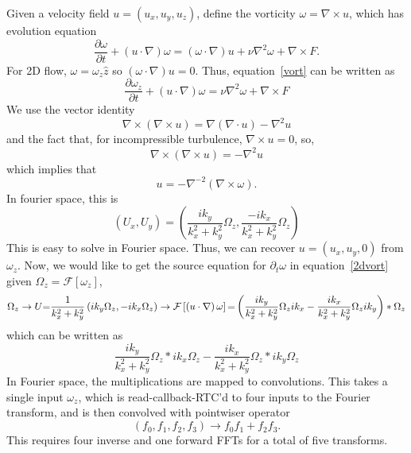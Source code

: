 \documentclass[12pt]{article}
\renewcommand{\(}{\left(}
\renewcommand{\)}{\right)}
\begin{document}
Given a velocity field $u=\(u_x,u_y,u_z\)$, define the vorticity
$\omega = \nabla \times u$, which has evolution equation
\begin{dmath}
  \label{vort}
  \frac{\partial \omega}{\partial t}
  + \(u \cdot{} \nabla \) \omega
  =
  \(\omega \cdot{} \nabla \) u
  + \nu \nabla^2 \omega
  + \nabla \times F.
\end{dmath}
For 2D flow, $\omega{}=\omega_z\hat{z}$ so $\(\omega \cdot \nabla\)u=0$.  Thus,
equation~\eqref{vort} can be written as
\begin{dmath}
  \label{2dvort}
  \frac{\partial \omega_z}{\partial t}
  + \(u \cdot{} \nabla \) \omega
  =
  \nu \nabla^2 \omega
  + \nabla \times F
\end{dmath}
We use the vector identity
\begin{dmath}
  \nabla \times \(\nabla \times u\)
  =
  \nabla\(\nabla \cdot{} u \)
  - \nabla^2 u
\end{dmath}
and the fact that, for incompressible turbulence, $\nabla \times u=0$,
so,
\begin{dmath}
  \nabla \times \(\nabla \times u\) = - \nabla^2 u
\end{dmath}
which implies that
\begin{dmath}
  \label{vort2vel2d}
  u = -\nabla^{ -2} \(\nabla \times \omega \).
\end{dmath}
In fourier space, this is
\begin{dmath}
  \(U_x,U_y\)
  =
  \(
  \frac{ik_y}{k_x^2 + k_y^2}\Omega_z,
  \frac{-ik_x}{k_x^2 + k_y^2}\Omega_z
  \)
\end{dmath}
This is easy to solve in Fourier space.  Thus, we can recover
$u=\(u_x,u_y,0\)$ from $\omega_z$.  Now, we would like to get the
source equation for $\partial_t \omega$ in equation~\eqref{2dvort}
given $\Omega_z = \mathcal{F}\left[\omega_z\right]$,
\begin{dmath}
  \Omega_z
  \rightarrow
  U \nobreak{=}
  \frac{1}{k_x^2 + k_y^2}
  \(ik_y \Omega_z , -ik_x \Omega_z \)
  \rightarrow
  \mathcal{F}\left[\(u \cdot{} \nabla \) \omega\right]
  \nobreak{=}
  \(
  \frac{ik_y}{k_x^2 + k_y^2} \Omega_z ik_x
  -\frac{ik_x}{k_x^2 + k_y^2} \Omega_z ik_y
  \)
  \ast
  \Omega_z
\end{dmath}
which can be written as
\begin{dmath}
  \frac{ik_y}{k_x^2 + k_y^2} \Omega_z \ast ik_x \Omega_z
  -\frac{ik_x}{k_x^2 + k_y^2} \Omega_z \ast ik_y \Omega_z
\end{dmath}
In Fourier space, the multiplications are mapped to convolutions.
This takes a single input $\omega_z$, which is read-callback-RTC'd to
four inputs to the Fourier transform, and is then convolved with
pointwiser operator
\begin{dmath}
  \(f_0, f_1, f_2, f_3\) \rightarrow f_0 f_1 + f_2 f_3.
\end{dmath}
This requires four inverse and one forward FFTs for a total of five
transforms.
\end{document}
